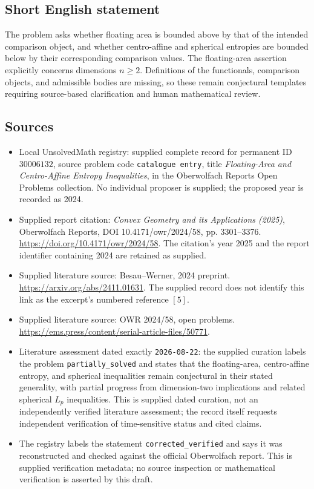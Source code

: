 \documentclass[11pt]{article}
\begin{document}
\subsection{Short English statement}
The problem asks whether floating area is bounded above by that of the intended comparison object, and whether centro-affine and spherical entropies are bounded below by their corresponding comparison values. The floating-area assertion explicitly concerns dimensions \(n\geq 2\). Definitions of the functionals, comparison objects, and admissible bodies are missing, so these remain conjectural templates requiring source-based clarification and human mathematical review.
\subsection{Sources}
\begin{itemize}
\item Local UnsolvedMath registry: supplied complete record for permanent ID \(30006132\), source problem code \texttt{catalogue entry}, title \emph{Floating-Area and Centro-Affine Entropy Inequalities}, in the Oberwolfach Reports Open Problems collection. No individual proposer is supplied; the proposed year is recorded as 2024.
\item Supplied report citation: \emph{Convex Geometry and its Applications (2025)}, Oberwolfach Reports, DOI 10.4171/owr/2024/58, pp. 3301--3376. \url{https://doi.org/10.4171/owr/2024/58}. The citation's year 2025 and the report identifier containing 2024 are retained as supplied.
\item Supplied literature source: Besau--Werner, 2024 preprint. \url{https://arxiv.org/abs/2411.01631}. The supplied record does not identify this link as the excerpt's numbered reference \([5]\).
\item Supplied literature source: OWR 2024/58, open problems. \url{https://ems.press/content/serial-article-files/50771}.
\item Literature assessment dated exactly \texttt{2026-08-22}: the supplied curation labels the problem \texttt{partially\_solved} and states that the floating-area, centro-affine entropy, and spherical inequalities remain conjectural in their stated generality, with partial progress from dimension-two implications and related spherical \(L_p\) inequalities. This is supplied dated curation, not an independently verified literature assessment; the record itself requests independent verification of time-sensitive status and cited claims.
\item The registry labels the statement \texttt{corrected\_verified} and says it was reconstructed and checked against the official Oberwolfach report. This is supplied verification metadata; no source inspection or mathematical verification is asserted by this draft.
\end{itemize}
\end{document}
